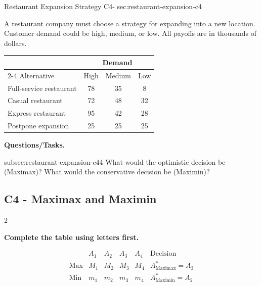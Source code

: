 	\sectionScored
	{Restaurant Expansion Strategy}
	{C4-}
	{sec:restaurant-expansion-c4}
	{
		A restaurant company must choose a strategy for expanding into a new
		location. Customer demand could be high, medium, or low. All payoffs are in
		thousands of dollars.
		
		\begin{center}
			\renewcommand{\arraystretch}{1.3}
			\small
			\begin{tabular}{lccc}
				\toprule
				& \multicolumn{3}{c}{Demand} \\
				\cmidrule(lr){2-4}
				Alternative & High & Medium & Low \\
				\midrule
				Full-service restaurant & 78 & 35 & 8 \\
				Casual restaurant & 72 & 48 & 32 \\
				Express restaurant & 95 & 42 & 28 \\
				Postpone expansion & 25 & 25 & 25 \\
				\bottomrule
			\end{tabular}
		\end{center}
		\vspace{-5mm}
		
		\textbf{Questions/Tasks.}
		\begin{enumerate}
			\CriterionTask
			{subsec:restaurant-expansion-c4}{4}
			{What would the optimistic decision be (Maximax)? What would the conservative decision be (Maximin)? }
		\end{enumerate}
		
		\label{subsec:restaurant-expansion-c4}
		\subsection*{C4 - Maximax and Maximin }
		
		
		\begin{multicols}{2}
			
			\textbf{Complete the table using letters first.}
			
			\[
			\begin{array}{c|ccccc}
				& A_1 & A_2 & A_3 & A_4 & \text{Decision}\\
				\hline
				\text{Max} &
				M_1 & M_2 & M_3 & M_4 &
				A^*_{\mathrm{Maximax}}=A_3
				\\
				\text{Min} &
				m_1 & m_2 & m_3 & m_4 &
				A^*_{\mathrm{Maximin}}=A_2
			\end{array}
			\]
			

\end{multicols}}
